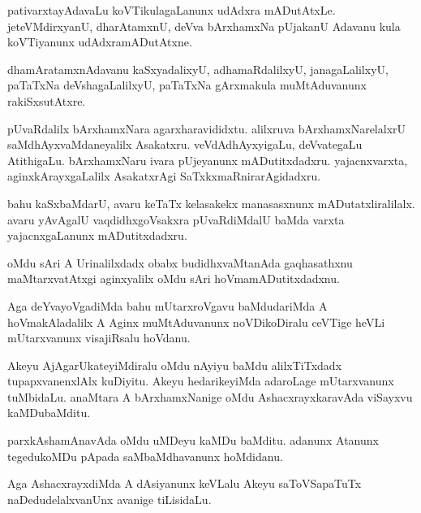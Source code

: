 \documentclass{article}
\begin{document}
\begin{mng}%
pativarxtayAdavaLu koVTikulagaLanunx udAdxra mADutAtxLe. jeteVMdirxyanU, dharAtamxnU, deVva 
bArxhamxNa pUjakanU Adavanu kula koVTiyanunx udAdxramADutAtxne.
\end{mng}

\begin{mng}%
dhamAratamxnAdavanu kaSxyadalixyU, adhamaRdalilxyU, janagaLalilxyU, paTaTxNa deVshagaLalilxyU, 
paTaTxNa gArxmakula muMtAduvanunx rakiSxsutAtxre.
\end{mng}

\begin{mng}%
pUvaRdalilx bArxhamxNara agarxharavididxtu. alilxruva bArxhamxNarelalxrU saMdhAyxvaMdaneyalilx 
Asakatxru. veVdAdhAyxyigaLu, deVvategaLu AtithigaLu. bArxhamxNaru ivara pUjeyanunx 
mADutitxdadxru. yajacnxvarxta, aginxkArayxgaLalilx AsakatxrAgi SaTxkxmaRnirarAgidadxru.
\end{mng}

\begin{mng}%
bahu kaSxbaMdarU, avaru keTaTx kelasakekx manasasxnunx mADutatxliralilalx. avaru yAvAgalU 
vaqdidhxgoVsakxra pUvaRdiMdalU baMda varxta yajacnxgaLanunx mADutitxdadxru.
\end{mng}

\begin{mng}%
oMdu sAri A Urinalilxdadx obabx budidhxvaMtanAda gaqhasathxnu maMtarxvatAtxgi aginxyalilx oMdu 
sAri hoVmamADutitxdadxnu.
\end{mng}

\begin{mng}%
Aga deYvayoVgadiMda bahu mUtarxroVgavu baMdudariMda A hoVmakAladalilx A Aginx muMtAduvanunx 
noVDikoDiralu ceVTige heVLi mUtarxvanunx visajiRsalu hoVdanu.
\end{mng}

\begin{mng}%
Akeyu AjAgarUkateyiMdiralu oMdu nAyiyu baMdu alilxTiTxdadx tupapxvanenxlAlx kuDiyitu. Akeyu 
hedarikeyiMda adaroLage mUtarxvanunx tuMbidaLu. anaMtara A bArxhamxNanige oMdu AshacxrayxkaravAda 
viSayxvu kaMDubaMditu.
\end{mng}

\begin{mng}%
parxkAshamAnavAda oMdu uMDeyu kaMDu baMditu. adanunx Atanunx tegedukoMDu pApada saMbaMdhavanunx 
hoMdidanu.
\end{mng}

\begin{mng}%
Aga AshacxrayxdiMda A dAsiyanunx keVLalu Akeyu saToVSapaTuTx naDedudelalxvanUnx avanige tiLisidaLu.
\end{mng}
\end{document}
